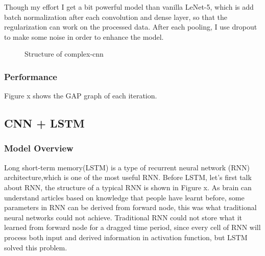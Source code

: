 \documentclass{article}
\begin{document}
Though my effort I get a bit powerful model than vanilla LeNet-5, which is add batch normalization after each convolution and dense layer, so that the regularization can work on the processed data. After each pooling, I use dropout to make some noise in order to enhance the model. 
 

\begin{figure}[h]
	\centering
	\caption{Structure of complex-cnn}
\end{figure} 

\subsubsection{Performance}
Figure x shows the GAP graph of each iteration.


\subsection{CNN + LSTM}
\subsubsection{Model Overview}
Long short-term memory(LSTM) is a type of recurrent neural network (RNN) architecture,which is one of the most useful RNN.  Before LSTM, let's first talk about RNN, the structure of a typical RNN is shown in Figure x. As brain can understand articles based on knowledge that people have learnt before, some parameters in RNN can be derived from forward node, this was what traditional neural networks could not achieve. Traditional RNN could not store what it learned from forward node for a dragged time period, since every cell of RNN will process both input and derived information in activation function, but LSTM solved this problem.
\end{document}
